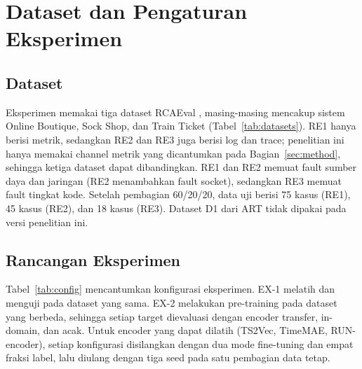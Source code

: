 \section{Dataset dan Pengaturan Eksperimen}\label{sec:setup}
\subsection{Dataset}
Eksperimen memakai tiga dataset RCAEval \cite{pham2024rcaeval}, masing-masing mencakup sistem Online Boutique, Sock Shop, dan Train Ticket (Tabel~\ref{tab:datasets}). RE1 hanya berisi metrik, sedangkan RE2 dan RE3 juga berisi log dan trace; penelitian ini hanya memakai channel metrik yang dicantumkan pada Bagian~\ref{sec:method}, sehingga ketiga dataset dapat dibandingkan. RE1 dan RE2 memuat fault sumber daya dan jaringan (RE2 menambahkan fault socket), sedangkan RE3 memuat fault tingkat kode. Setelah pembagian 60/20/20, data uji berisi 75 kasus (RE1), 45 kasus (RE2), dan 18 kasus (RE3). Dataset D1 dari ART tidak dipakai pada versi penelitian ini.


\subsection{Rancangan Eksperimen}
Tabel~\ref{tab:config} mencantumkan konfigurasi eksperimen. EX-1 melatih dan menguji pada dataset yang sama. EX-2 melakukan pre-training pada dataset yang berbeda, sehingga setiap target dievaluasi dengan encoder transfer, in-domain, dan acak. Untuk encoder yang dapat dilatih (TS2Vec, TimeMAE, RUN-encoder), setiap konfigurasi disilangkan dengan dua mode fine-tuning dan empat fraksi label, lalu diulang dengan tiga seed pada satu pembagian data tetap.


